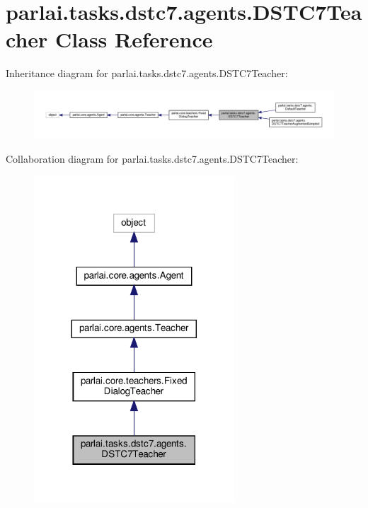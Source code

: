\hypertarget{classparlai_1_1tasks_1_1dstc7_1_1agents_1_1DSTC7Teacher}{}\section{parlai.\+tasks.\+dstc7.\+agents.\+D\+S\+T\+C7\+Teacher Class Reference}
\label{classparlai_1_1tasks_1_1dstc7_1_1agents_1_1DSTC7Teacher}


Inheritance diagram for parlai.\+tasks.\+dstc7.\+agents.\+D\+S\+T\+C7\+Teacher\+:
\nopagebreak
\begin{figure}[H]
\begin{center}
\leavevmode
\includegraphics[width=350pt]{classparlai_1_1tasks_1_1dstc7_1_1agents_1_1DSTC7Teacher__inherit__graph}
\end{center}
\end{figure}


Collaboration diagram for parlai.\+tasks.\+dstc7.\+agents.\+D\+S\+T\+C7\+Teacher\+:
\nopagebreak
\begin{figure}[H]
\begin{center}
\leavevmode
\includegraphics[width=212pt]{classparlai_1_1tasks_1_1dstc7_1_1agents_1_1DSTC7Teacher__coll__graph}
\end{center}
\end{figure}
